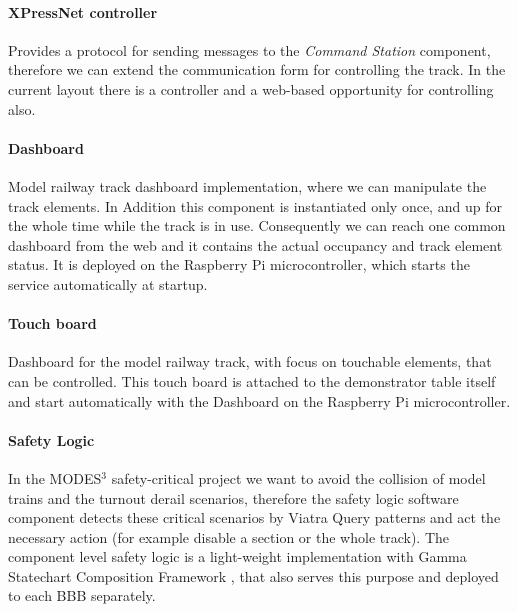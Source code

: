 \paragraph{XPressNet controller}
Provides a protocol for sending messages to the \textit{Command Station} component, therefore we can extend the communication form for controlling the track. In the current layout there is a controller and a web-based opportunity for controlling also.
\paragraph{Dashboard}
Model railway track dashboard implementation, where we can manipulate the track elements. In Addition this component is instantiated only once, and up for the whole time while the track is in use. Consequently we can reach one common dashboard from the web and it contains the actual occupancy and track element status. It is deployed on the Raspberry Pi microcontroller, which starts the service automatically at startup.
\paragraph{Touch board}
Dashboard for the model railway track, with focus on touchable elements, that can be controlled. This touch board is attached to the demonstrator table itself and start automatically with the Dashboard on the Raspberry Pi microcontroller.
\paragraph{Safety Logic}
In the MODES$^3$ safety-critical project we want to avoid the collision of model trains and the turnout derail scenarios, therefore the safety logic software component detects these critical scenarios by Viatra Query \cite{Viatra} patterns and act the necessary action (for example disable a section or the whole track). The component level safety logic is a light-weight implementation with Gamma Statechart Composition Framework \cite{Gamma}, that also serves this purpose and deployed to each BBB separately.

